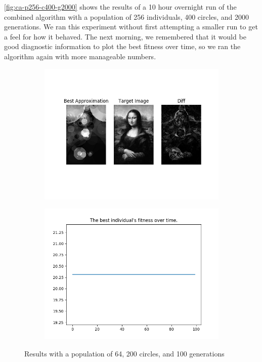 \documentclass{article}
\begin{document}
\autoref{fig:ca-p256-c400-g2000} shows the results of a 10 hour overnight run of the combined
algorithm with a population of 256 individuals, 400 circles, and 2000 generations. We ran this
experiment without first attempting a smaller run to get a feel for how it behaved. The next
morning, we remembered that it would be good diagnostic information to plot the best fitness over
time, so we ran the algorithm again with more manageable numbers.

\begin{figure}[H]
    \centering
    \begin{subfigure}[b]{0.45\textwidth}
        \centering
        \includegraphics[width=\textwidth]{output/ca-p64c200g100.png}
    \end{subfigure}
    \begin{subfigure}[b]{0.45\textwidth}
        \centering
        \includegraphics[width=\textwidth]{output/ca-p64c200g100-fitness.png}
    \end{subfigure}
    \caption{Results with a population of 64, 200 circles, and 100
        generations}\label{fig:ca-p64-c200-g100}
\end{figure}
\end{document}
